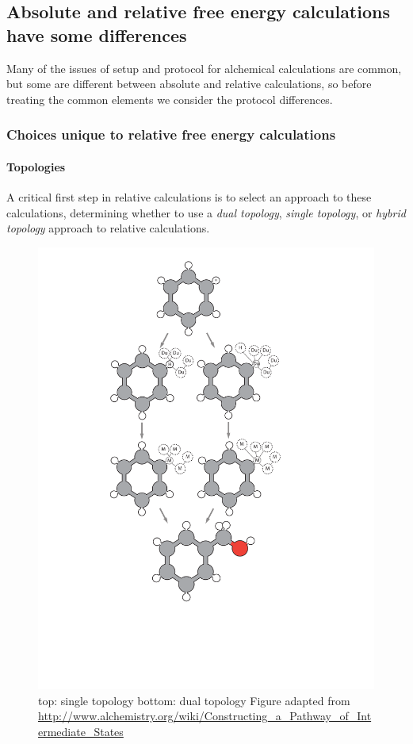 \documentclass[9pt,bestpractices]{livecoms}
\begin{document}
\subsection*{Absolute and relative free energy calculations have some differences}
Many of the issues of setup and protocol for alchemical calculations are common, but some are different between absolute and relative calculations, so before treating the common elements we consider the protocol differences.


\subsubsection*{Choices unique to relative free energy calculations}

\paragraph{Topologies} A critical first step in relative calculations is to select an approach to these calculations, determining whether to use a \emph{dual topology}, \emph{single topology}, or \emph{hybrid topology} approach to relative calculations.
\begin{figure}
    \includegraphics[width=0.95\columnwidth]{paper/figures/fig4_topol/Fig4.pdf}
    \caption{top: single topology bottom: dual topology Figure adapted from \url{http://www.alchemistry.org/wiki/Constructing_a_Pathway_of_Intermediate_States}}
    \label{fig:fig4_topology}
\end{figure} 
\end{document}
